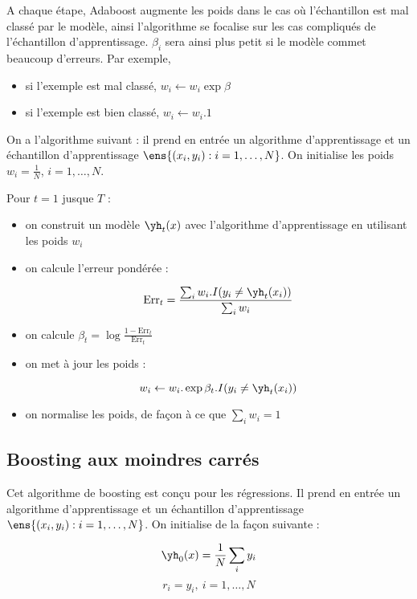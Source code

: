 	A chaque étape, Adaboost augmente les poids dans le cas où l'échantillon est mal classé par le modèle, ainsi l'algorithme se focalise sur les cas compliqués de l'échantillon d'apprentissage. $\beta_i$ sera ainsi plus petit si le modèle commet beaucoup d'erreurs. Par exemple,
	
	\begin{itemize}
		\item si l'exemple est mal classé, $w_i \leftarrow w_i \exp{\beta}$
		\item si l'exemple est bien classé, $w_i \leftarrow w_i . 1$
	\end{itemize}
	
	On a l'algorithme suivant : il prend en entrée un algorithme d'apprentissage et un échantillon d'apprentissage $\ens{(x_i, y_i) : i = 1, \dots , N}$. On initialise les poids $w_i = \frac{1}{N}$, $i = 1 , \dots , N$.
	
	Pour $t = 1$ jusque $T$ :
	
	\begin{itemize}
		\item on construit un modèle $\yh_t(x)$ avec l'algorithme d'apprentissage en utilisant les poids $w_i$
		\item on calcule l'erreur pondérée :
		
		$$\text{Err}_t = \frac{\sum_i w_i . I(y_i \neq \yh_t(x_i))}{\sum_i w_i}$$
		
		\item on calcule $\beta_t = \log{\frac{1 - \text{Err}_t}{\text{Err}_t}}$
		\item on met à jour les poids :
		
		$$w_i \leftarrow w_i . \exp{\beta_t . I(y_i \neq \yh_t(x_i))}$$
		
		\item on normalise les poids, de façon à ce que $\sum_i w_i = 1$
	\end{itemize}
	
		
	\subsection{Boosting aux moindres carrés}
	
	Cet algorithme de boosting est conçu pour les régressions. Il prend en entrée un algorithme d'apprentissage et un échantillon d'apprentissage $\ens{(x_i, y_i) : i = 1, \dots , N}$. On initialise de la façon suivante :
	
	$$\yh_0(x) = \frac{1}{N} \sum_i y_i$$
	$$r_i = y_i, \: i = 1, \dots , N$$
	
